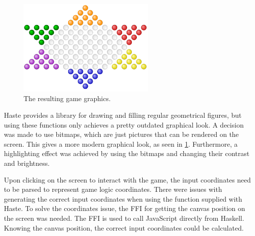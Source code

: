 \documentclass[a4paper]{article}
\begin{document}
\begin{figure}[h!]
    \centering
    \includegraphics[scale=0.8,width=0.6\textwidth]{figure/game}
    \caption{The resulting game graphics.}
    \label{fig:gameGraphics}
\end{figure}



Haste provides a library for drawing and filling regular geometrical figures, but using these functions only achieves a pretty outdated graphical look. A decision was made to use bitmaps, which are just pictures that can be rendered on the screen. This gives a more modern graphical look, as seen in \cref{fig:gameGraphics}. Furthermore, a highlighting effect was achieved by using the bitmaps and changing their contrast and brightness. 


Upon clicking on the screen to interact with the game, the input coordinates need to be parsed to represent game logic coordinates. There were issues with generating the correct input coordinates when using the function supplied with Haste. To solve the coordinates issue, the FFI for getting the canvas position on the screen was needed. The FFI is used to call JavaScript directly from Haskell. Knowing the canvas position, the correct input coordinates could be calculated. 



\end{document}
